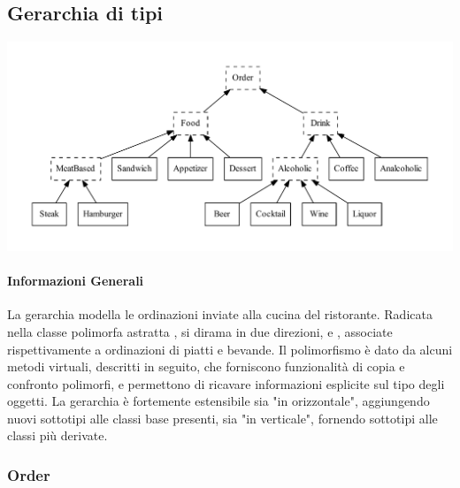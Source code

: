 \subsection{Gerarchia di tipi} %
\label{sub:gerarchia_di_tipi}
\includegraphics[width=\linewidth]{gerarchia.pdf}
\paragraph{Informazioni Generali} %
\label{par:informazioni_generali}
La gerarchia modella le ordinazioni inviate alla cucina del ristorante. Radicata nella classe polimorfa astratta , si dirama in due direzioni,  e , associate rispettivamente a ordinazioni di piatti e bevande. Il polimorfismo è dato da alcuni metodi virtuali, descritti in seguito, che forniscono funzionalità di copia e confronto polimorfi, e permettono di ricavare informazioni esplicite sul tipo degli oggetti. La gerarchia è fortemente estensibile sia "in orizzontale", aggiungendo nuovi sottotipi alle classi base presenti, sia "in verticale", fornendo sottotipi alle classi più derivate.
\subsubsection{Order} %
\label{ssub:order}
